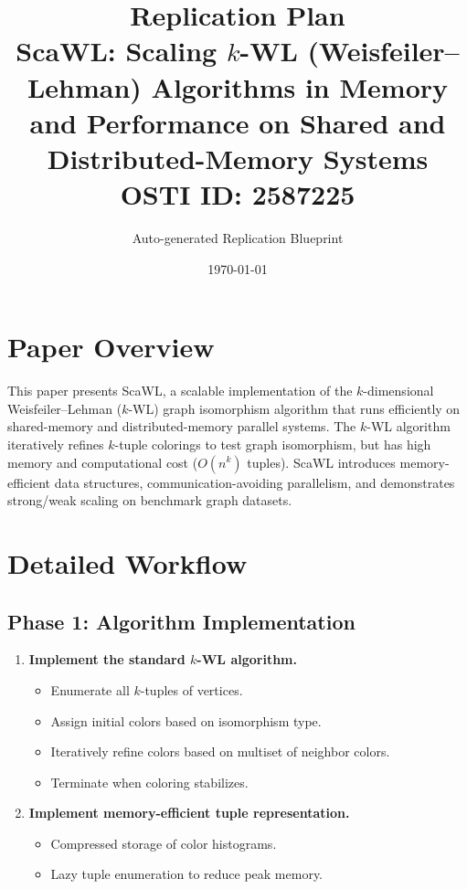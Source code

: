 \documentclass[11pt,a4paper]{article}
\title{\textbf{Replication Plan}\\[0.5em]
\large ScaWL: Scaling $k$-WL (Weisfeiler--Lehman) Algorithms in Memory and Performance on Shared and Distributed-Memory Systems\\[0.3em]
\normalsize OSTI ID: 2587225}
\author{Auto-generated Replication Blueprint}
\date{\today}
\begin{document}
\maketitle
\tableofcontents
\newpage

\section{Paper Overview}
This paper presents ScaWL, a scalable implementation of the $k$-dimensional Weisfeiler--Lehman ($k$-WL) graph isomorphism algorithm that runs efficiently on shared-memory and distributed-memory parallel systems. The $k$-WL algorithm iteratively refines $k$-tuple colorings to test graph isomorphism, but has high memory and computational cost ($O(n^k)$ tuples). ScaWL introduces memory-efficient data structures, communication-avoiding parallelism, and demonstrates strong/weak scaling on benchmark graph datasets.

\section{Detailed Workflow}

\subsection{Phase 1: Algorithm Implementation}
\begin{enumerate}[label=\textbf{1.\arabic*}]
  \item \textbf{Implement the standard $k$-WL algorithm.}
    \begin{itemize}
      \item Enumerate all $k$-tuples of vertices.
      \item Assign initial colors based on isomorphism type.
      \item Iteratively refine colors based on multiset of neighbor colors.
      \item Terminate when coloring stabilizes.
    \end{itemize}
  \item \textbf{Implement memory-efficient tuple representation.}
    \begin{itemize}
      \item Compressed storage of color histograms.
      \item Lazy tuple enumeration to reduce peak memory.
    \end{itemize}
\end{enumerate}
\end{document}
